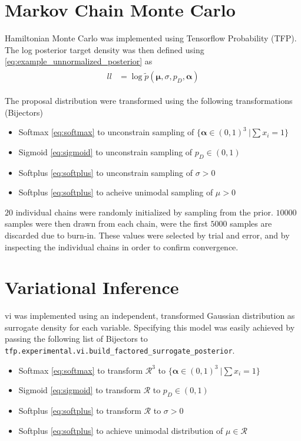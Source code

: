 \section{Markov Chain Monte Carlo}
Hamiltonian Monte Carlo was implemented using Tensorflow Probability (TFP). The log posterior target density was then defined using \cref{eq:example_unnormalized_posterior} as 
\begin{align}\label{eq:example_ll}
\begin{split}
    ll &= \log \tilde{p}(\boldsymbol{\mu}, \sigma, p_D, \boldsymbol{\alpha})
\end{split}
\end{align}


The proposal distribution were transformed using the following transformations (Bijectors)

\begin{itemize}
\item Softmax \eqref{eq:softmax} to unconstrain sampling of $\{\boldsymbol{\alpha} \in (0, 1)^3\ | \sum x_i = 1\}$
\item Sigmoid \eqref{eq:sigmoid} to unconstrain sampling of $p_D \in (0, 1)$
\item Softplus \eqref{eq:softplus} to unconstrain sampling of $\sigma > 0$
\item Softplus \eqref{eq:softplus} to acheive unimodal sampling of $\mu > 0$
\end{itemize}

$20$ individual chains were randomly initialized by sampling from the prior. $10000$ samples were then drawn from each chain, were the first $5000$ samples are discarded due to burn-in. These values were selected by trial and error, and by inspecting the individual chains in order to confirm convergence.  

\section{Variational Inference}

\acrshort{vi} was implemented using an independent, transformed Gaussian distribution as surrogate density for each variable. Specifying this model was easily achieved by passing the following list of Bijectors to \texttt{tfp.experimental.vi.build\_factored\_surrogate\_posterior}.
\begin{itemize}
\item Softmax \eqref{eq:softmax} to transform $\mathcal{R}^3$ to $\{\boldsymbol{\alpha} \in (0, 1)^3\ | \sum x_i = 1\}$
\item Sigmoid \eqref{eq:sigmoid} to transform $\mathcal{R}$ to $p_D \in (0, 1)$
\item Softplus \eqref{eq:softplus} to transform $\mathcal{R}$ to $\sigma > 0$
\item Softplus \eqref{eq:softplus} to achieve unimodal distribution of $\mu \in \mathcal{R}$
\end{itemize}

